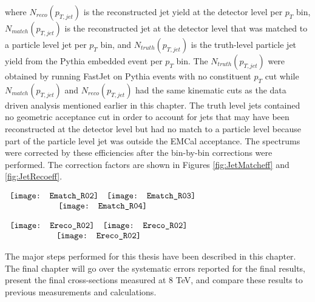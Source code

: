 \noindent 
where $N_{reco} (p_{T, jet})$ is the reconstructed jet yield at the detector level per $p_{T}$ bin, $N_{match}(p_{T, jet})$ is the reconstructed jet at the detector level that was matched to a particle level jet per $p_{T}$ bin, and $N_{truth} (p_{T, jet})$ is the truth-level particle jet yield from the Pythia embedded event per $p_{T}$ bin.  The $N_{truth} (p_{T, jet})$ were obtained by running FastJet on Pythia events with no constituent $p_{T}$ cut while $N_{match}(p_{T, jet})$ and $N_{reco} (p_{T, jet})$ had the same kinematic cuts as the data driven analysis mentioned earlier in this chapter.  The truth level jets contained no geometric acceptance cut in order to account for jets that may have been reconstructed at the detector level but had no match to a particle level because part of the particle level jet was outside the EMCal acceptance.  The spectrums were corrected by these efficiencies after the bin-by-bin corrections were performed.  The correction factors are shown in Figures \ref{fig:JetMatcheff} and \ref{fig:JetRecoeff}.

\begin{figure*}[t!]
$\begin{array}{rl}
    \texttt{[image: Ematch\_R02]} &
    \texttt{[image: Ematch\_R03]}\\
    \multicolumn{2}{c}{\texttt{[image: Ematch\_R04]}}
\end{array}$
\caption[Jet reconstruction efficiency for jets between R = 0.2 and R = 0.4. ]{\label{fig:JetMatcheff}Jet matching efficiency for jets between R = 0.2 and R = 0.4.}
\end{figure*}

\begin{figure*}[t!]
$\begin{array}{rl}
    \texttt{[image: Ereco\_R02]} &
    \texttt{[image: Ereco\_R02]}\\
    \multicolumn{2}{c}{\texttt{[image: Ereco\_R02]}}
\end{array}$
\caption[Jet reconstruction efficiency for jets between R = 0.2 and R = 0.4.]{\label{fig:JetRecoeff}Jet reconstruction efficiency for jets between R = 0.2 and R = 0.4}
\end{figure*}


The major steps performed for this thesis have been described in this chapter.  The final chapter will go over the systematic errors reported for the final results, present the final cross-sections measured at 8 TeV, and compare these results to previous measurements and  calculations.

